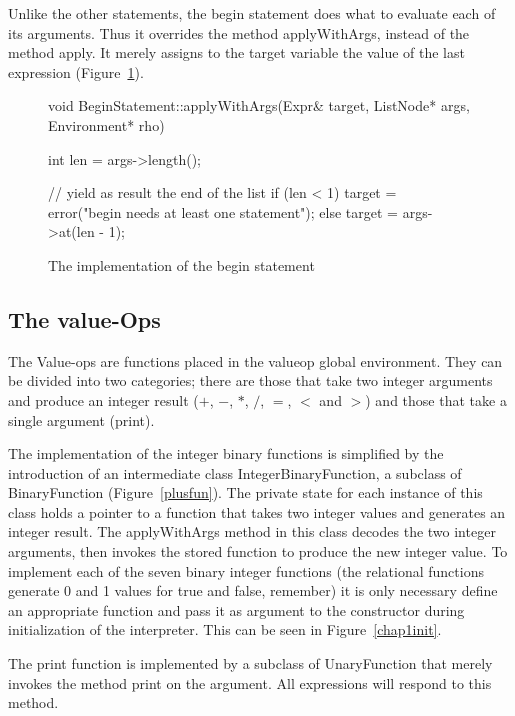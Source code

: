 Unlike the other statements, the begin statement does what to evaluate each
of its arguments.  Thus it overrides the method {\sf applyWithArgs},
instead of the method {\sf apply}.  It merely assigns to the target
variable the value of the last expression (Figure~\ref{beginstatement}).

\begin{figure}
\begin{cprog}
void BeginStatement::applyWithArgs(Expr& target, ListNode* args, Environment* rho)
{
	int len = args->length();

	// yield as result the end of the list
	if (len < 1) 
		target = error("begin needs at least one statement");
	else
		target = args->at(len - 1);
}
\end{cprog}
\caption{The implementation of the begin statement}\label{beginstatement}
\end{figure}

\subsection{The value-Ops}

The Value-ops are functions placed in the {\sf valueop} global environment.
They can be divided into two categories; there are those that take two
integer arguments and produce an integer result ($+$, $-$, $*$, $/$, $=$,
$<$ and $>$) and those that take a single argument ({\sf print}).  

The implementation of the integer binary functions is simplified by the
introduction of an intermediate class {\sf IntegerBinaryFunction}, a
subclass of {\sf BinaryFunction} (Figure~\ref{plusfun}).  
The private state for each instance of this class holds a pointer to a
function that takes two integer values and generates an integer result.
The {\sf applyWithArgs} method in this class
decodes the two integer arguments, then invokes the stored function to
produce the new integer value.  To implement each of the seven binary
integer functions (the relational functions generate 0 and 1 values for
true and false, remember) it is only necessary define an appropriate
function and pass it as argument to the constructor during initialization of
the interpreter.  This can be seen in Figure~\ref{chap1init}.

The print function is implemented by a subclass of {\sf UnaryFunction}
that merely invokes the method {\sf print} on the argument.  All
expressions will respond to this method.

